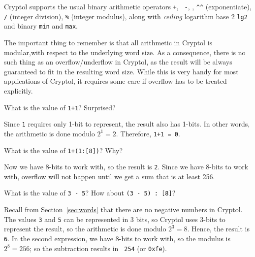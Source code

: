 Cryptol supports the usual binary arithmetic operators {\tt +}, {\tt
  -}, {\tt *}, {\tt \Verb|^^|} (exponentiate), {\tt /} (integer
division), {\tt \%} (integer modulus), along with \emph{ceiling}
logarithm base 2 {\tt lg2} and binary {\tt min} and {\tt max}.

The important thing to remember is that all arithmetic in Cryptol is
modular,\indModular with respect to the underlying word size.  As a
consequence, there is no such thing as an overflow/underflow in
Cryptol, as the result will be always guaranteed to fit in the
resulting word size.  While this is very handy for most applications of
Cryptol, it requires some care if overflow has to be treated
explicitly.\indOverflow\indUnderflow\indPlus\indMinus\indTimes\indDiv\indMod\indLg\indMin\indMax\indExponentiate

\begin{Exercise}\label{ex:arith:1}
What is the value of {\tt 1+1}? Surprised?
\end{Exercise}
\begin{Answer}
  Since {\tt 1} requires only 1-bit to represent, the result also has
  1-bits. In other words, the arithmetic is done modulo $2^1 =
  2$. Therefore, {\tt 1+1 = 0}.
\end{Answer}

\begin{Exercise}\label{ex:arith:2}
What is the value of {\tt 1+(1:[8])}? Why?
\end{Exercise}
\begin{Answer}
  Now we have 8-bits to work with, so the result is {\tt 2}. Since we
  have 8-bits to work with, overflow will not happen until we get a
  sum that is at least 256.
\end{Answer}

\begin{Exercise}\label{ex:arith:3}
What is the value of {\tt 3 - 5}? How about {\tt (3 - 5) : [8]}?
\end{Exercise}
\begin{Answer}
  Recall from Section~\ref{sec:words} that there are no negative
  numbers in Cryptol. The values {\tt 3} and {\tt 5} can be
  represented in 3 bits, so Cryptol uses 3-bits to represent the
  result, so the arithmetic is done modulo $2^3=8$. Hence, the result
  is {\tt 6}.  In the second expression, we have 8-bits to work with,
  so the modulus is $2^8 = 256$; so the subtraction results in {\tt
    254} (or {\tt 0xfe}).
\end{Answer}

